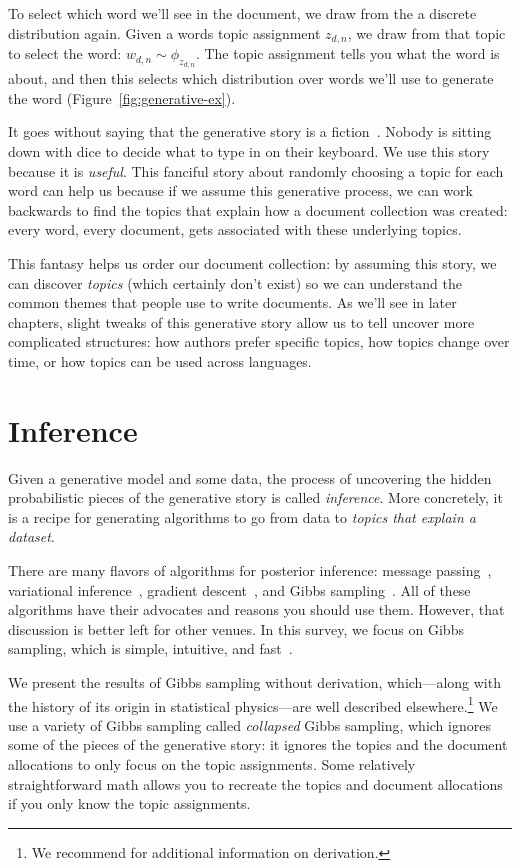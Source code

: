 To select which word we'll see in the document, we draw from the a discrete
distribution again.  Given a words topic assignment $z_{d,n}$, we draw from that
topic to select the word: $w_{d,n} \sim \phi_{z_{d,n}}$.  The topic assignment
tells you what the word is about, and then this selects which distribution over
words we'll use to generate the word (Figure~\ref{fig:generative-ex}).

It goes without saying that the generative story is a fiction~\citep{box-87}.
Nobody is sitting down with dice to decide what to type in on their keyboard.
We use this story because it is \emph{useful}.  This fanciful story about randomly
choosing a topic for each word can help us because if we assume this generative
process, we can work backwards to find the topics that explain how a document
collection was created: every word, every document, gets associated with these
underlying topics.

This fantasy helps us order our document collection: by assuming this story, we
can discover \emph{topics} (which certainly don't exist) so we can understand
the common themes that people use to write documents.  As we'll see in later
chapters, slight tweaks of this generative story allow us to tell uncover more
complicated structures: how authors prefer specific topics, how topics change
over time, or how topics can be used across languages.

\section{Inference}

Given a generative model and some data, the process of uncovering the hidden
probabilistic pieces of the generative story is called \emph{inference}.  More
concretely, it is a recipe for generating algorithms to go from data to
\emph{topics that explain a dataset}.

There are many flavors of algorithms for posterior inference: message
passing~\citep{zeng-13}, variational inference~\citep{blei-03}, gradient
descent~\citep{hoffman-10}, and Gibbs sampling~\citep{griffiths-04}.  All of
these algorithms have their advocates and reasons you should use them.  However,
that discussion is better left for other venues.  In this survey, we focus
on Gibbs sampling, which is simple, intuitive, and fast~\citep{yao-09}.

We present the results of Gibbs sampling without derivation,
which---along with the history of its origin in statistical
physics---are well described elsewhere.\footnote{We recommend
  \citet{resnik-09} for additional information on derivation.} We use
a variety of Gibbs sampling called \emph{collapsed} Gibbs sampling,
which ignores some of the pieces of the generative story: it ignores
the topics and the document allocations to only focus on the topic
assignments.  Some relatively straightforward math allows you to
recreate the topics and document allocations if you only know the
topic assignments.

